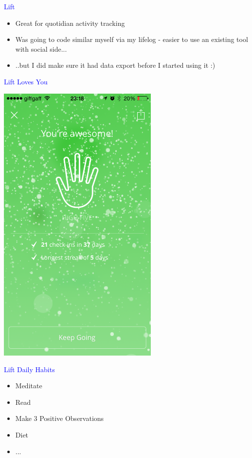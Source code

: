 \documentclass[landscape]{slides}
\begin{document}
\begin{slide}

    \textcolor{blue}{\Large{Lift}}

    \begin{itemize}
        \item Great for quotidian activity tracking
        \item Was going to code similar myself via my lifelog - easier
              to use an existing tool with social side...
        \item ..but I did make sure it had data export before I started using it :)
    \end{itemize}

\end{slide}


\begin{slide}

    \textcolor{blue}{\Large{Lift Loves You}}

    \begin{center}
        \includegraphics[width=8cm]{lift-jubilant-high-five}
    \end{center}

\end{slide}


\begin{slide}

    \textcolor{blue}{\Large{Lift Daily Habits}}

    \begin{itemize}
        \item Meditate
        \item Read
        \item Make 3 Positive Observations
        \item Diet
        \item ...
    \end{itemize}

\end{slide}
\end{document}
